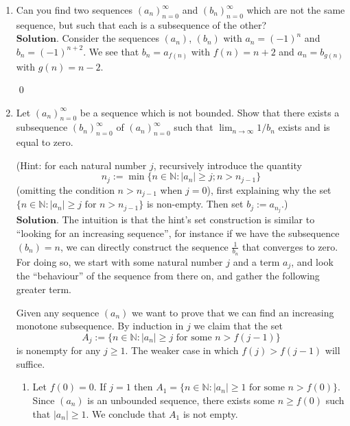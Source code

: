 \documentclass{article}
\theoremstyle{remark}
\begin{document}
\begin{enumerate}
    \item Can you find two sequences $(a_n)_{n=0}^\infty$ and $(b_n)_{n=0}^\infty$ 
    which are not the same sequence, but such that each is a subsequence of the other?
    \\$\textbf{Solution.}$
    Consider the sequences $(a_n)$, $(b_n)$ with $a_n = (-1)^{n}$ and $b_n = (-1)^{n+2}$.
    We see that $b_n = a_{f(n)}$ with $f(n) = n+2$ and $a_n = b_{g(n)}$ with $g(n) = n-2$.
    \begin{flushright}
        \qed
    \end{flushright}

    \item Let $(a_n)_{n=0}^\infty$ be a sequence which is not bounded. 
    Show that there exists a subsequence $(b_n)_{n=0}^\infty$ of $(a_n)_{n=0}^\infty$ 
    such that $\lim_{n \to \infty} 1/b_n$ exists and is equal to zero. 

    (Hint: for each natural number $j$, recursively introduce the quantity 
    \[ n_j := \min\{n \in \mathbb{N}: |a_n| \geq j; n > n_{j-1}\} \] 
    (omitting the condition $n > n_{j-1}$ when $j = 0$), 
    first explaining why the set $\{n \in \mathbb{N}: |a_n| \geq j \text{ for } n > n_{j-1}\}$ is non-empty. 
    Then set $b_j := a_{n_j}$.)
    \\$\textbf{Solution.}$
    The intuition is that the hint's set construction is similar to ``looking for an increasing sequence'',
    for instance if we have the subsequence $(b_n) = n$, we can directly construct the sequence $\frac{1}{b_n}$
    that converges to zero. For doing so, we start with some natural number $j$ and a term $a_j$, and look the ``behaviour'' of 
    the sequence from there on, and gather the following greater term.

    Given any sequence $(a_n)$ we want to prove that we can find an increasing monotone subsequence.
    By induction in $j$ we claim that the set
    \[
    A_j := \{n \in \mathbb{N}: |a_n| \geq j \text{ for some } n > f(j-1)\}
    \]
    is nonempty for any $j \geq 1$.
    The weaker case in which $f(j) > f(j-1)$ will suffice.
    \begin{enumerate}
        \item[\textbf{Basis.}]
        Let $f(0) = 0$.
        If $j = 1$ then $A_1 = \{n\in \mathbb{N}: |a_n| \geq 1 \text{ for some } n > f(0)\}$.
        Since $(a_n)$ is an unbounded sequence, there exists some $n \geq f(0)$ such that
        $\vert a_n \vert \geq 1$.
        We conclude that $A_1$ is not empty.
        

\end{enumerate}
\end{enumerate}
\end{document}
